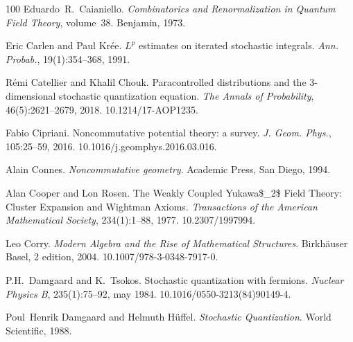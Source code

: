 \documentclass{article}
\newcommand{\tmtextit}[1]{{\itshape{#1}}}
\begin{document}
\begin{thebibliography}{100}
  Eduardo~R.~Caianiello.
  {\newblock}\tmtextit{Combinatorics and Renormalization in Quantum Field
  Theory},  volume~38. {\newblock}Benjamin, 1973.{\newblock}
  
  Eric Carlen  and  Paul Kr{\'e}e. {\newblock}$L^p$
  estimates on iterated stochastic integrals. {\newblock}\tmtextit{Ann.
  Probab.}, 19(1):354--368, 1991.{\newblock}
  
  R{\'e}mi Catellier  and  Khalil
  Chouk. {\newblock}Paracontrolled distributions and the 3-dimensional
  stochastic quantization equation. {\newblock}\tmtextit{The Annals of
  Probability}, 46(5):2621--2679, 2018.
  {\newblock}\href{Https://doi.org/10.1214/17-AOP1235}{}10.1214/17-AOP1235.{\newblock}
  
  Fabio Cipriani. {\newblock}Noncommutative potential
  theory: a survey. {\newblock}\tmtextit{J. Geom. Phys.}, 105:25--59, 2016.
  {\newblock}\href{Https://doi.org/10.1016/j.geomphys.2016.03.016}{}10.1016/j.geomphys.2016.03.016.{\newblock}
  
  Alain Connes.
  {\newblock}\tmtextit{Noncommutative geometry}. {\newblock}Academic Press,
  San Diego, 1994.{\newblock}
  
  Alan Cooper  and  Lon Rosen. {\newblock}The
  Weakly Coupled Yukawa\$\_2\$ Field Theory: Cluster Expansion and Wightman
  Axioms. {\newblock}\tmtextit{Transactions of the American Mathematical
  Society}, 234(1):1--88, 1977.
  {\newblock}\href{Https://doi.org/10.2307/1997994}{}10.2307/1997994.{\newblock}
  
  Leo Corry. {\newblock}\tmtextit{Modern
  Algebra and the Rise of Mathematical Structures}. {\newblock}Birkh{\"a}user
  Basel, 2  edition, 2004.
  {\newblock}\href{Https://doi.org/10.1007/978-3-0348-7917-0}{}10.1007/978-3-0348-7917-0.{\newblock}
  
  P.H.~Damgaard  and  K.~Tsokos.
  {\newblock}Stochastic quantization with fermions.
  {\newblock}\tmtextit{Nuclear Physics B}, 235(1):75--92, may 1984.
  {\newblock}\href{Https://doi.org/10.1016/0550-3213(84)90149-4}{}10.1016/0550-3213(84)90149-4.{\newblock}
  
  Poul~Henrik Damgaard  and  Helmuth
  H{\"u}ffel. {\newblock}\tmtextit{Stochastic Quantization}. {\newblock}World
  Scientific, 1988.{\newblock}
  

\end{thebibliography}
\end{document}
